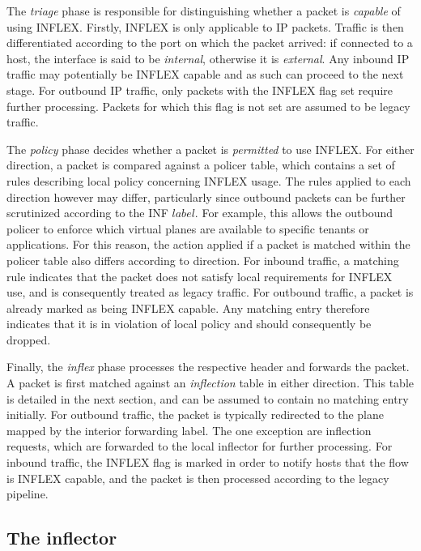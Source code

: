 The \emph{triage} phase is responsible for distinguishing whether a packet is \emph{capable} of using INFLEX.
Firstly, INFLEX is only applicable to \ac{IP} packets.
Traffic is then differentiated according to the port on which the packet arrived: if connected to a host, the interface is said to be \emph{internal}, otherwise it is \emph{external}.
Any inbound \ac{IP} traffic may potentially be INFLEX capable and as such can proceed to the next stage.
For outbound \ac{IP} traffic, only packets with the INFLEX flag set require further processing.
Packets for which this flag is not set are assumed to be legacy traffic.

The \emph{policy} phase decides whether a packet is \emph{permitted} to use INFLEX.
For either direction, a packet is compared against a policer table, which contains a set of rules describing local policy concerning INFLEX usage.
The rules applied to each direction however may differ, particularly since outbound packets can be further scrutinized according to the INF $label$.
For example, this allows the outbound policer to enforce which virtual planes are available to specific tenants or applications.
For this reason, the action applied if a packet is matched within the policer table also differs according to direction.
For inbound traffic, a matching rule indicates that the packet does not satisfy local requirements for INFLEX use, and is consequently treated as legacy traffic.
For outbound traffic, a packet is already marked as being INFLEX capable.
Any matching entry therefore indicates that it is in violation of local policy and should consequently be dropped.

Finally, the \emph{inflex} phase processes the respective header and forwards the packet.
A packet is first matched against an \emph{inflection} table in either direction.
This table is detailed in the next section, and can be assumed to contain no matching entry initially.
For outbound traffic, the packet is typically redirected to the  plane mapped by the interior forwarding label.
The one exception are inflection requests, which are forwarded to the local inflector for further processing.
For inbound traffic, the INFLEX flag is marked in order to notify hosts that the flow is INFLEX capable, and the packet is then processed according to the legacy pipeline.

\subsection{The inflector}

